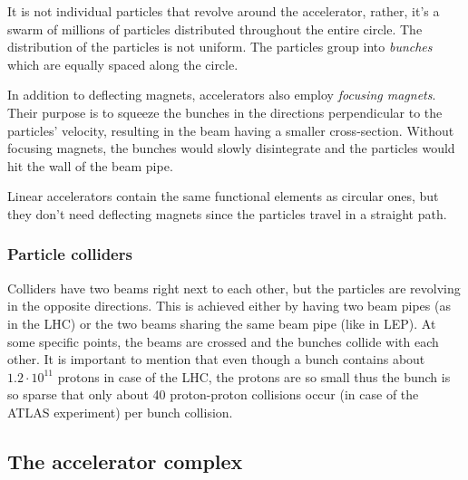 \documentclass[12pt]{article}
\begin{document}
It is not individual particles that revolve around the accelerator, rather, it's a swarm of millions of particles distributed throughout the entire circle. The distribution of the particles is not uniform. The particles group into \textit{bunches} which are equally spaced along the circle.

In addition to deflecting magnets, accelerators also employ \textit{focusing magnets}. Their purpose is to squeeze the bunches in the directions perpendicular to the particles' velocity, resulting in the beam having a smaller cross-section. Without focusing magnets, the bunches would slowly disintegrate and the particles would hit the wall of the beam pipe.

Linear accelerators contain the same functional elements as circular ones, but they don't need deflecting magnets since the particles travel in a straight path.


\subsubsection{Particle colliders}\label{sec_part_collider}

Colliders have two beams right next to each other, but the particles are revolving in the opposite directions. This is achieved either by having two beam pipes (as in the LHC) or the two beams sharing the same beam pipe (like in LEP). At some specific points, the beams are crossed and the bunches collide with each other. It is important to mention that even though a bunch contains about $1.2\cdot 10^{11}$ protons\cite{lhc_facts_and_figures} in case of the LHC, the protons are so small thus the bunch is so sparse that only about 40 proton-proton collisions occur (in case of the ATLAS experiment) per bunch collision.


\subsection{The accelerator complex}\label{sec_accel_complex}
\end{document}
